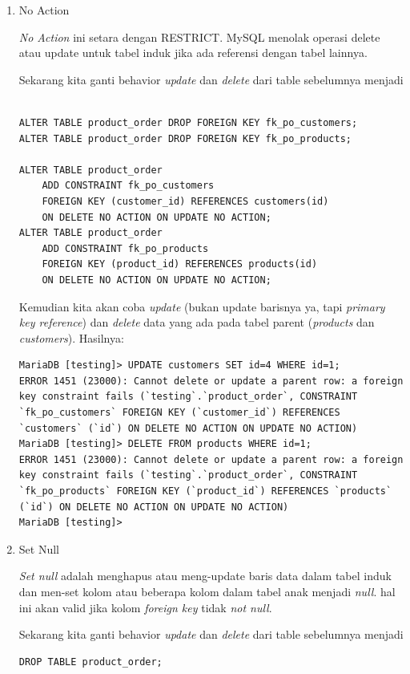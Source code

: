 \documentclass[a4paper]{article}
\newcommand{\code}[1]{\allowbreak{\texttt{#1}}}
\begin{document}
\begin{enumerate}
	\item No Action

\textit{No Action} ini setara dengan RESTRICT. MySQL menolak operasi delete atau update untuk tabel induk jika ada referensi dengan tabel lainnya. 

Sekarang kita ganti behavior \textit{update} dan \textit{delete} dari table sebelumnya menjadi \code{No Action}
\begin{lstlisting}

ALTER TABLE product_order DROP FOREIGN KEY fk_po_customers;
ALTER TABLE product_order DROP FOREIGN KEY fk_po_products;

ALTER TABLE product_order
	ADD CONSTRAINT fk_po_customers 
	FOREIGN KEY (customer_id) REFERENCES customers(id)
	ON DELETE NO ACTION ON UPDATE NO ACTION;
ALTER TABLE product_order 
	ADD CONSTRAINT fk_po_products
	FOREIGN KEY (product_id) REFERENCES products(id)
	ON DELETE NO ACTION ON UPDATE NO ACTION;
\end{lstlisting}

Kemudian kita akan coba  \textit{update} (bukan update barisnya ya, tapi \textit{primary key reference}) dan \textit{delete} data yang ada pada tabel parent (\textit{products} dan \textit{customers}). Hasilnya:

\begin{lstlisting}
MariaDB [testing]> UPDATE customers SET id=4 WHERE id=1;
ERROR 1451 (23000): Cannot delete or update a parent row: a foreign key constraint fails (`testing`.`product_order`, CONSTRAINT `fk_po_customers` FOREIGN KEY (`customer_id`) REFERENCES `customers` (`id`) ON DELETE NO ACTION ON UPDATE NO ACTION)
MariaDB [testing]> DELETE FROM products WHERE id=1;
ERROR 1451 (23000): Cannot delete or update a parent row: a foreign key constraint fails (`testing`.`product_order`, CONSTRAINT `fk_po_products` FOREIGN KEY (`product_id`) REFERENCES `products` (`id`) ON DELETE NO ACTION ON UPDATE NO ACTION)
MariaDB [testing]> 
\end{lstlisting}


	\item Set Null

\textit{Set null} adalah menghapus atau meng-update baris data dalam tabel induk dan men-set kolom atau beberapa kolom dalam tabel anak menjadi \textit{null}. hal ini akan valid jika kolom \textit{foreign key} tidak \textit{not null}. 

Sekarang kita ganti behavior \textit{update} dan \textit{delete} dari table sebelumnya menjadi \code{SET NULL}
\begin{lstlisting}
DROP TABLE product_order;


\end{lstlisting}
\end{enumerate}
\end{document}
